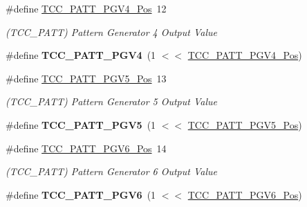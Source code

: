 \begin{DoxyCompactItemize}
\item 
\hypertarget{group___s_a_m_l21___t_c_c_gac3df60184052306780b0bb2d320b2cb6}{}\#define \hyperlink{group___s_a_m_l21___t_c_c_gac3df60184052306780b0bb2d320b2cb6}{T\+C\+C\+\_\+\+P\+A\+T\+T\+\_\+\+P\+G\+V4\+\_\+\+Pos}~12\label{group___s_a_m_l21___t_c_c_gac3df60184052306780b0bb2d320b2cb6}

\begin{DoxyCompactList}\small\item\em (T\+C\+C\+\_\+\+P\+A\+T\+T) Pattern Generator 4 Output Value \end{DoxyCompactList}\item 
\hypertarget{group___s_a_m_l21___t_c_c_ga075b9ac7e3179a9b6f5eaa1c82708916}{}\#define {\bfseries T\+C\+C\+\_\+\+P\+A\+T\+T\+\_\+\+P\+G\+V4}~(1 $<$$<$ \hyperlink{group___s_a_m_l21___t_c_c_gac3df60184052306780b0bb2d320b2cb6}{T\+C\+C\+\_\+\+P\+A\+T\+T\+\_\+\+P\+G\+V4\+\_\+\+Pos})\label{group___s_a_m_l21___t_c_c_ga075b9ac7e3179a9b6f5eaa1c82708916}

\item 
\hypertarget{group___s_a_m_l21___t_c_c_gaf42e937f00f56edd3a479f8178aad311}{}\#define \hyperlink{group___s_a_m_l21___t_c_c_gaf42e937f00f56edd3a479f8178aad311}{T\+C\+C\+\_\+\+P\+A\+T\+T\+\_\+\+P\+G\+V5\+\_\+\+Pos}~13\label{group___s_a_m_l21___t_c_c_gaf42e937f00f56edd3a479f8178aad311}

\begin{DoxyCompactList}\small\item\em (T\+C\+C\+\_\+\+P\+A\+T\+T) Pattern Generator 5 Output Value \end{DoxyCompactList}\item 
\hypertarget{group___s_a_m_l21___t_c_c_ga8d9c98b0b6b3e17b8994187d5213d9d6}{}\#define {\bfseries T\+C\+C\+\_\+\+P\+A\+T\+T\+\_\+\+P\+G\+V5}~(1 $<$$<$ \hyperlink{group___s_a_m_l21___t_c_c_gaf42e937f00f56edd3a479f8178aad311}{T\+C\+C\+\_\+\+P\+A\+T\+T\+\_\+\+P\+G\+V5\+\_\+\+Pos})\label{group___s_a_m_l21___t_c_c_ga8d9c98b0b6b3e17b8994187d5213d9d6}

\item 
\hypertarget{group___s_a_m_l21___t_c_c_gab10273b2726d8e341c167a8b8ced0d59}{}\#define \hyperlink{group___s_a_m_l21___t_c_c_gab10273b2726d8e341c167a8b8ced0d59}{T\+C\+C\+\_\+\+P\+A\+T\+T\+\_\+\+P\+G\+V6\+\_\+\+Pos}~14\label{group___s_a_m_l21___t_c_c_gab10273b2726d8e341c167a8b8ced0d59}

\begin{DoxyCompactList}\small\item\em (T\+C\+C\+\_\+\+P\+A\+T\+T) Pattern Generator 6 Output Value \end{DoxyCompactList}\item 
\hypertarget{group___s_a_m_l21___t_c_c_gaae727891e0495f2e6d1367b78b653c87}{}\#define {\bfseries T\+C\+C\+\_\+\+P\+A\+T\+T\+\_\+\+P\+G\+V6}~(1 $<$$<$ \hyperlink{group___s_a_m_l21___t_c_c_gab10273b2726d8e341c167a8b8ced0d59}{T\+C\+C\+\_\+\+P\+A\+T\+T\+\_\+\+P\+G\+V6\+\_\+\+Pos})\label{group___s_a_m_l21___t_c_c_gaae727891e0495f2e6d1367b78b653c87}


\end{DoxyCompactItemize}
